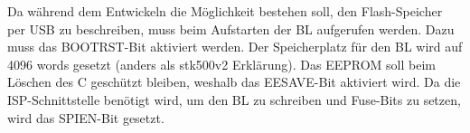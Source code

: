 Da während dem Entwickeln die Möglichkeit bestehen soll, den Flash-Speicher per USB zu beschreiben, muss beim Aufstarten der BL aufgerufen werden. Dazu muss das BOOTRST-Bit aktiviert werden. Der Speicherplatz für den BL wird auf 4096 words gesetzt (anders als stk500v2 Erklärung). Das EEPROM soll beim Löschen des \textmu C geschützt bleiben, weshalb das EESAVE-Bit aktiviert wird. Da die ISP-Schnittstelle benötigt wird, um den BL zu schreiben und Fuse-Bits zu setzen, wird das SPIEN-Bit gesetzt.
%
%
%
%
%
%
%
%
%
%
%
%
%
%
%
%
%
%

